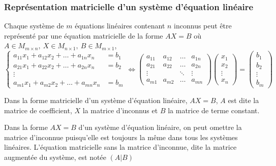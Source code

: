 \subsubsection{Représentation matricielle d'un système d'équation linéaire}
\begin{theorem}
    Chaque système de $m$ équations linéaires contenant $n$ inconnus peut être représenté par une équation matricielle de la forme $AX = B$ où $A \in M_{m \times n}, \ X \in M_{n \times 1}, \ B \in M_{m \times 1}$,
    \[
        \begin{cases}
            a_{11}x_1 + a_{12}x_2 + \ldots + a_{1n}x_n & = b_1 \\
            a_{21}x_1 + a_{22}x_2 + \ldots + a_{2n}x_n & = b_2 \\
            \vdots                                             \\
            a_{m1}x_1 + a_{m2}x_2 + \ldots + a_{mn}x_n & = b_m
        \end{cases} \iff \begin{pmatrix}
            a_{11} & a_{12}      & \dots  & a_{1n} \\
            a_{21} & a_{22}      & \dots  & a_{2n} \\
            \vdots & \phantom{a} & \ddots & \vdots \\
            a_{m1} & a_{m2}      & \dots  & a_{mn}
        \end{pmatrix} \begin{pmatrix}
            x_1    \\
            x_2    \\
            \vdots \\
            x_n
        \end{pmatrix} = \begin{pmatrix}
            b_1    \\
            b_2    \\
            \vdots \\
            b_m
        \end{pmatrix}
    \]
\end{theorem}
\begin{definition}
    Dans la forme matricielle d'un système d'équation linéaire, $AX = B$, $A$ est dite la matrice de coefficient, $X$ la matrice d'inconnus et $B$ la matrice de terme constant.
\end{definition}
\begin{definition}
    Dans la forme $AX = B$ d'un système d'équation linéaire, on peut omettre la matrice d'inconnue puisqu'elle est toujours la même dans tous les systèmes linéaires. L'équation matricielle sans la matrice d'inconnue, dite la matrice augmentée du système, est notée $(A|B)$
\end{definition}

